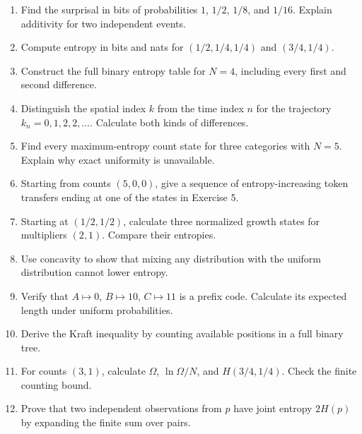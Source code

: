 \documentclass[11pt,oneside,openany]{book}
\theoremstyle{definition}
\theoremstyle{remark}
\newenvironment{exercises}{\begin{enumerate}[label=\thechapter.\arabic*,ref=\thechapter.\arabic*,leftmargin=2.8em,itemsep=6pt]}{\end{enumerate}}
\numberwithin{equation}{chapter}
\begin{document}
\begin{exercises}

\item 

Find the surprisal in bits of probabilities \(1\), \(1/2\), \(1/8\), and \(1/16\). Explain additivity for two independent events.

\item 

Compute entropy in bits and nats for \((1/2,1/4,1/4)\) and \((3/4,1/4)\).

\item 

Construct the full binary entropy table for \(N=4\), including every first and second difference.

\item 

Distinguish the spatial index \(k\) from the time index \(n\) for the trajectory \(k_n=0,1,2,2,\ldots\). Calculate both kinds of differences.

\item 

Find every maximum-entropy count state for three categories with \(N=5\). Explain why exact uniformity is unavailable.

\item 

Starting from counts \((5,0,0)\), give a sequence of entropy-increasing token transfers ending at one of the states in Exercise 5.

\item 

Starting at \((1/2,1/2)\), calculate three normalized growth states for multipliers \((2,1)\). Compare their entropies.

\item 

Use concavity to show that mixing any distribution with the uniform distribution cannot lower entropy.

\item 

Verify that \(A\mapsto0\), \(B\mapsto10\), \(C\mapsto11\) is a prefix code. Calculate its expected length under uniform probabilities.

\item 

Derive the Kraft inequality by counting available positions in a full binary tree.

\item 

For counts \((3,1)\), calculate \(\Omega\), \(\ln\Omega/N\), and \(H(3/4,1/4)\). Check the finite counting bound.

\item 

Prove that two independent observations from \(p\) have joint entropy \(2H(p)\) by expanding the finite sum over pairs.

\end{exercises}
\end{document}
